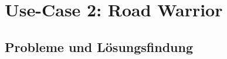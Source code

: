 \section{Use-Case 2: Road Warrior} \label{Use-Case 2: Road Warrior}



\subsection{Probleme und Lösungsfindung}
